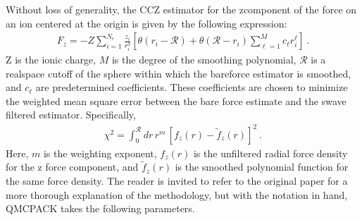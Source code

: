 \documentclass[letterpaper,10pt,english]{sphinxmanual}
\begin{document}
Without loss of generality, the CCZ estimator for the z\sphinxhyphen{}component of the
force on an ion centered at the origin is given by the following
expression:
\begin{equation}\label{equation:hamiltonianobservable:eq44}
\begin{split}F_z = -Z \sum_{i=1}^{N_e}\frac{z_i}{r_i^3}[\theta(r_i-\mathcal{R}) + \theta(\mathcal{R}-r_i)\sum_{\ell=1}^{M}c_\ell r_i^\ell]\:.\end{split}
\end{equation}
Z is the ionic charge, \(M\) is the degree of the smoothing
polynomial, \(\mathcal{R}\) is a real\sphinxhyphen{}space cutoff of the sphere
within which the bare\sphinxhyphen{}force estimator is smoothed, and \(c_\ell\)
are predetermined coefficients. These coefficients are chosen to
minimize the weighted mean square error between the bare force estimate
and the s\sphinxhyphen{}wave filtered estimator. Specifically,
\begin{equation}\label{equation:hamiltonianobservable:eq45}
\begin{split}\chi^2 = \int_0^\mathcal{R}dr\,r^m\,[f_z(r) - \tilde{f}_z(r)]^2\:.\end{split}
\end{equation}
Here, \(m\) is the weighting exponent, \(f_z(r)\) is the
unfiltered radial force density for the z force component, and
\(\tilde{f}_z(r)\) is the smoothed polynomial function for the same
force density. The reader is invited to refer to the original paper for
a more thorough explanation of the methodology, but with the notation in
hand, QMCPACK takes the following parameters.
\end{document}
